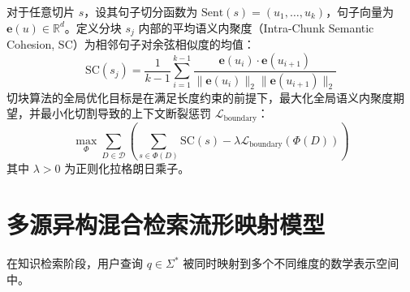 \begin{definition}[分块语义内聚度与边界损失]
    对于任意切片 $s$，设其句子切分函数为 $\text{Sent}(s) = (u_1, \ldots, u_k)$，句子向量为 $\mathbf{e}(u) \in \mathbb{R}^d$。定义分块 $s_j$ 内部的平均语义内聚度（Intra-Chunk Semantic Cohesion, $\text{SC}$）为相邻句子对余弦相似度的均值：
    \begin{equation}
        \text{SC}(s_j) = \frac{1}{k-1} \sum_{i=1}^{k-1} \frac{\mathbf{e}(u_i) \cdot \mathbf{e}(u_{i+1})}{\|\mathbf{e}(u_i)\|_2 \|\mathbf{e}(u_{i+1})\|_2}
    \end{equation}
    切块算法的全局优化目标是在满足长度约束的前提下，最大化全局语义内聚度期望，并最小化切割导致的上下文断裂惩罚 $\mathcal{L}_{\text{boundary}}$：
    \begin{equation}
        \max_{\Phi} \sum_{D \in \mathcal{D}} \left( \sum_{s \in \Phi(D)} \text{SC}(s) - \lambda \mathcal{L}_{\text{boundary}}(\Phi(D)) \right)
    \end{equation}
    其中 $\lambda > 0$ 为正则化拉格朗日乘子。
\end{definition}

\section{多源异构混合检索流形映射模型}

在知识检索阶段，用户查询 $q \in \Sigma^*$ 被同时映射到多个不同维度的数学表示空间中。

